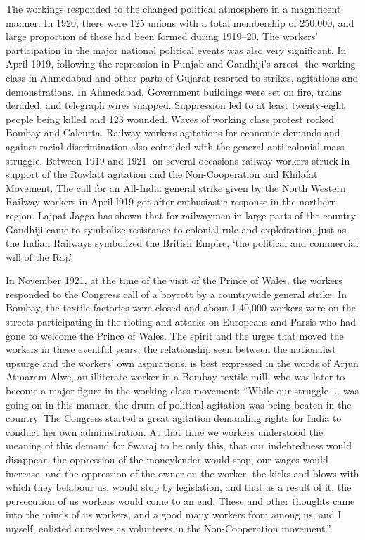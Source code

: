 \begin{multicols}{2}
The workings responded to the changed political atmosphere in a magnificent manner. In 1920, there were 125 unions with a total membership of 250,000, and large proportion of these had been formed during 1919--20. The workers' participation in the major national political events was also very significant. In April 1919, following the repression in Punjab and Gandhiji's arrest, the working class in Ahmedabad and other parts of Gujarat resorted to strikes, agitations and demonstrations. In Ahmedabad, Government buildings were set on fire, trains derailed, and telegraph wires snapped. Suppression led to at least twenty-eight people being killed and 123 wounded. Waves of working class protest rocked Bombay and Calcutta. Railway workers agitations for economic demands and against racial discrimination also coincided with the general anti-colonial mass struggle. Between 1919 and 1921, on several occasions railway workers struck in support of the Rowlatt agitation and the Non-Cooperation and Khilafat Movement. The call for an All-India general strike given by the North Western Railway workers in April l919 got after enthusiastic response in the northern region. Lajpat Jagga has shown that for railwaymen in large parts of the country Gandhiji came to symbolize resistance to colonial rule and exploitation, just as the Indian Railways symbolized the British Empire, `the political and commercial will of the Raj.'

In November 1921, at the time of the visit of the Prince of Wales, the workers responded to the Congress call of a boycott by a countrywide general strike. In Bombay, the textile factories were closed and about 1,40,000 workers were on the streets participating in the rioting and attacks on Europeans and Parsis who had gone to welcome the Prince of Wales. The spirit and the urges that moved the workers in these eventful years, the relationship seen between the nationalist upsurge and the workers' own aspirations, is best expressed in the words of Arjun Atmaram Alwe, an illiterate worker in a Bombay textile mill, who was later to become a major figure in the working class movement: ``While our struggle ... was going on in this manner, the drum of political agitation was being beaten in the country. The Congress started a great agitation demanding rights for India to conduct her own administration. At that time we workers understood the meaning of this demand for Swaraj to be only this, that our indebtedness would disappear, the oppression of the moneylender would stop, our wages would increase, and the oppression of the owner on the worker, the kicks and blows with which they belabour us, would stop by legislation, and that as a result of it, the persecution of us workers would come to an end. These and other thoughts came into the minds of us workers, and a good many workers from among us, and I myself, enlisted ourselves as volunteers in the Non-Cooperation movement.''


\end{multicols}
